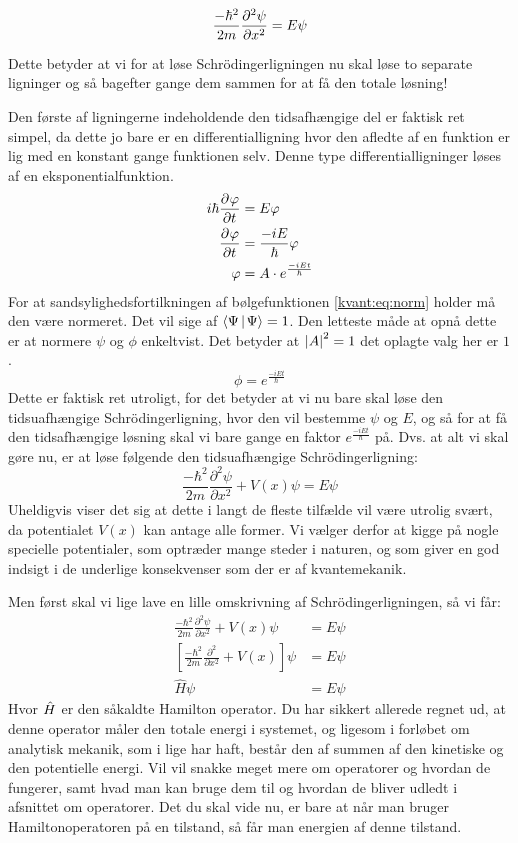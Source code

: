 \documentclass[../Kvantemekanik.tex]{subfiles}
\begin{document}
\begin{equation}
\frac{-\hbar^2}{2m}\pdif[2]{x}\psi = E\psi
\end{equation}


Dette betyder at vi for at løse Schrödingerligningen nu skal løse to separate ligninger og så bagefter gange dem sammen for at få den totale løsning!

Den første af ligningerne indeholdende den tidsafhængige del er faktisk ret simpel, da dette jo bare er en differentialligning hvor den afledte af en funktion er lig med en konstant gange funktionen selv. Denne type differentialligninger løses af en eksponentialfunktion.
\begin{align}
    i\hbar\pdif{t}\phi&=E\phi\nonumber\\
    \pdif{t}\phi &=\frac{-iE}{\hbar}\phi\nonumber\\
    \phi&=A\cdot e^{\frac{-iEt}{\hbar}}
\end{align}
For at sandsylighedsfortilkningen af bølgefunktionen \eqref{kvant:eq:norm} holder må den være normeret. Det vil sige af $\braket{\Psi}{\Psi}=1$. Den letteste måde at opnå dette er at normere $\psi$ og $\phi$ enkeltvist. Det betyder at $\abs{A}^2=1$ det oplagte valg her er $1$.
\begin{equation}
    \phi=e^{\frac{-iEt}{\hbar}}
\end{equation}
Dette er faktisk ret utroligt, for det betyder at vi nu bare skal løse den tidsuafhængige Schrödingerligning, hvor den vil bestemme $\psi$ og $E$, og så for at få den tidsafhængige løsning skal vi bare gange en faktor $e^{\frac{-iEt}{\hbar}}$ på.
Dvs. at alt vi skal gøre nu, er at løse følgende den tidsuafhængige Schrödingerligning:
\begin{equation*}
    \frac{-\hbar^{2}}{2m}\frac{\partial^2\psi}{\partial x^2}+V(x)\psi=E\psi
\end{equation*}
Uheldigvis viser det sig at dette i langt de fleste tilfælde vil være utrolig svært, da potentialet $V(x)$ kan antage alle former. Vi vælger derfor at kigge på nogle specielle potentialer, som optræder mange steder i naturen, og som giver en god indsigt i de underlige konsekvenser som der er af kvantemekanik.

Men først skal vi lige lave en lille omskrivning af Schrödingerligningen, så vi får:
\begin{align}
    \frac{-\hbar^{2}}{2m}\frac{\partial^2\psi}{\partial x^2}+V(x)\psi&=E\psi\nonumber\\
    \left[\frac{-\hbar^{2}}{2m}\frac{\partial^2}{\partial x^2}+V(x)\right]\psi&=E\psi\nonumber\\
    \hat{H}\psi&=E\psi
\end{align}
Hvor $\op{H}$ er den såkaldte Hamilton operator. Du har sikkert allerede regnet ud, at denne operator måler den totale energi i systemet, og ligesom i forløbet om analytisk mekanik, som i lige har haft, består den af summen af den kinetiske og den potentielle energi. Vil vil snakke meget mere om operatorer og hvordan de fungerer, samt hvad man kan bruge dem til og hvordan de bliver udledt i afsnittet om operatorer. Det du skal vide nu, er bare at når man bruger Hamiltonoperatoren på en tilstand, så får man energien af denne tilstand.
\end{document}
